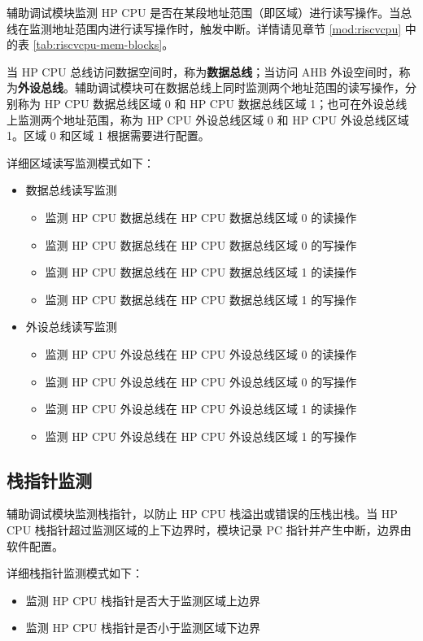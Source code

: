 \documentclass[main\_\_CN.tex]{subfiles}
\begin{document}
辅助调试模块监测 HP CPU 是否在某段地址范围（即区域）进行读写操作。当总线在监测地址范围内进行读写操作时，触发中断。详情请见章节 \ref{mod:riscvcpu} \textit{} 中的表 \ref{tab:riscvcpu-mem-blocks}。

当 HP CPU 总线访问数据空间时，称为\textbf{数据总线}；当访问 AHB 外设空间时，称为\textbf{外设总线}。辅助调试模块可在数据总线上同时监测两个地址范围的读写操作，分别称为 HP CPU 数据总线区域 0 和 HP CPU 数据总线区域 1；也可在外设总线上监测两个地址范围，称为 HP CPU 外设总线区域 0 和 HP CPU 外设总线区域 1。区域 0 和区域 1 根据需要进行配置。

详细区域读写监测模式如下：
\begin{itemize}
    \item 数据总线读写监测
        \begin{itemize}
            \item 监测 HP CPU 数据总线在 HP CPU 数据总线区域 0 的读操作
            \item 监测 HP CPU 数据总线在 HP CPU 数据总线区域 0 的写操作
            \item 监测 HP CPU 数据总线在 HP CPU 数据总线区域 1 的读操作
            \item 监测 HP CPU 数据总线在 HP CPU 数据总线区域 1 的写操作
        \end{itemize}    
    \item 外设总线读写监测
        \begin{itemize}
            \item 监测 HP CPU 外设总线在 HP CPU 外设总线区域 0 的读操作
            \item 监测 HP CPU 外设总线在 HP CPU 外设总线区域 0 的写操作
            \item 监测 HP CPU 外设总线在 HP CPU 外设总线区域 1 的读操作
            \item 监测 HP CPU 外设总线在 HP CPU 外设总线区域 1 的写操作
        \end{itemize}
\end{itemize}

\subsection{栈指针监测}

辅助调试模块监测栈指针，以防止 HP CPU 栈溢出或错误的压栈出栈。当 HP CPU 栈指针超过监测区域的上下边界时，模块记录 PC 指针并产生中断，边界由软件配置。

详细栈指针监测模式如下：
\begin{itemize}
    \item 监测 HP CPU 栈指针是否大于监测区域上边界
    \item 监测 HP CPU 栈指针是否小于监测区域下边界
\end{itemize}
\end{document}
